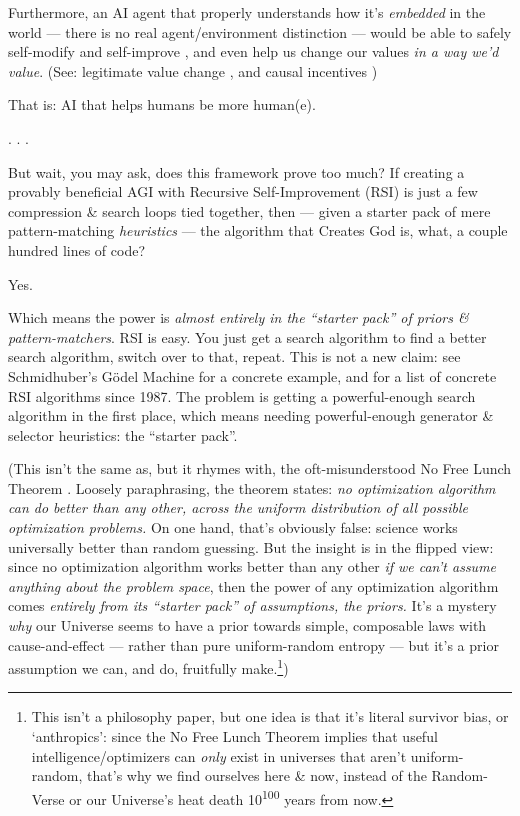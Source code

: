 \documentclass[11pt]{article}
\begin{document}
Furthermore, an AI agent that properly understands how it's \textit{embedded} in the world — there is no real agent/environment distinction — would be able to safely self-modify and self-improve \citep{everitt_self_modification,godel_machine}, and even help us change our values \textit{in a way we'd value}. (See: legitimate value change \citep{value_change_problem}, and causal incentives \citep{causal_foundations_tutorial,agent_incentives_causal})

That is: AI that helps humans be more human(e).

. . .

But wait, you may ask, does this framework prove too much? If creating a provably beneficial AGI with Recursive Self-Improvement (RSI) is just a few compression \& search loops tied together, then — given a starter pack of mere pattern-matching \textit{heuristics} — the algorithm that Creates God is, what, a couple hundred lines of code?

Yes.

Which means the power is \textit{almost entirely in the ``starter pack'' of priors \& pattern-matchers}. RSI is easy. You just get a search algorithm to find a better search algorithm, switch over to that, repeat. This is not a new claim: see Schmidhuber's Gödel Machine \citep{godel_machine} for a concrete example, and \citet{schmidhuber_rsi_since_1987} for a list of concrete RSI algorithms since 1987. The problem is getting a powerful-enough search algorithm in the first place, which means needing powerful-enough generator \& selector heuristics: the ``starter pack''.

(This isn't the same as, but it rhymes with, the oft-misunderstood No Free Lunch Theorem \citep{no_free_lunch}. Loosely paraphrasing, the theorem states: \textit{no optimization algorithm can do better than any other, across the uniform distribution of all possible optimization problems.} On one hand, that's obviously false: science works universally better than random guessing. But the insight is in the flipped view: since no optimization algorithm works better than any other \textit{if we can't assume anything about the problem space}, then the power of any optimization algorithm comes \textit{entirely from its ``starter pack'' of assumptions, the priors.} It's a mystery \textit{why} our Universe seems to have a prior towards simple, composable laws with cause-and-effect — rather than pure uniform-random entropy — but it's a prior assumption we can, and do, fruitfully make.\footnote{This isn't a philosophy paper, but one idea is that it's literal survivor bias, or `anthropics': since the No Free Lunch Theorem implies that useful intelligence/optimizers can \textit{only} exist in universes that aren't uniform-random, that's why we find ourselves here \& now, instead of the Random-Verse or our Universe's heat death 10\textsuperscript{100} years from now.})
\end{document}

